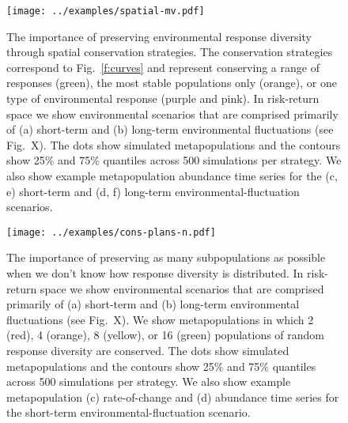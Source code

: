 \clearpage

\begin{figure}[htbp]
\centering
\texttt{[image: ../examples/spatial-mv.pdf]}
\caption{The importance of preserving environmental response diversity through spatial conservation strategies. The conservation strategies correspond to Fig.~\ref{f:curves} and represent conserving a range of responses (green), the most stable populations only (orange), or one type of environmental response (purple and pink).  In risk-return space we show environmental scenarios that are comprised primarily of (a) short-term and (b) long-term environmental fluctuations (see Fig.~X). The dots show simulated metapopulations and the contours show 25\% and 75\% quantiles across 500 simulations per strategy. We also show example metapopulation abundance time series for the (c, e) short-term and (d, f) long-term  environmental-fluctuation scenarios.}
\label{f:sp-mv}
\end{figure}

\clearpage

\begin{figure}[htbp]
\centering
\texttt{[image: ../examples/cons-plans-n.pdf]}
\caption{The importance of preserving as many subpopulations as possible when we don't know how response diversity is distributed. In risk-return space we show environmental scenarios that are comprised primarily of (a) short-term and (b) long-term environmental fluctuations (see Fig.~X). We show metapopulations in which 2 (red), 4 (orange), 8 (yellow), or 16 (green) populations of random response diversity are conserved. The dots show simulated metapopulations and the contours show 25\% and 75\% quantiles across 500 simulations per strategy. We also show example metapopulation (c) rate-of-change and (d) abundance time series for the short-term environmental-fluctuation scenario.}
\label{f:n-mv}
\end{figure}

\clearpage

